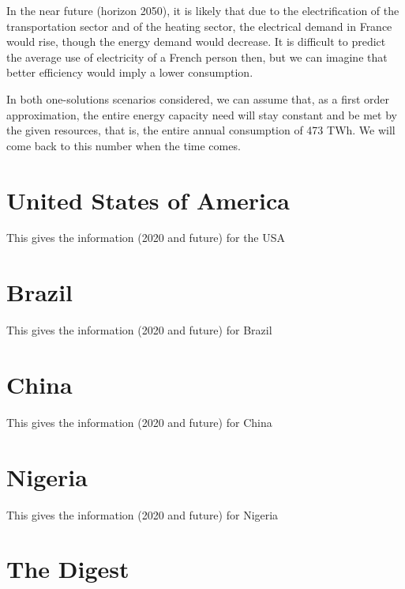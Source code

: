 In the near future (horizon 2050), it is likely that due to the electrification of the transportation sector and of the heating sector, the electrical demand in France would rise, though the energy demand would decrease. It is difficult to predict the average use of electricity of a French person then, but we can imagine that better efficiency would imply a lower consumption.


In both one-solutions scenarios considered, we can assume that, as a first order approximation, the entire energy capacity need will stay constant and be met by the given resources, that is, the entire annual consumption of 473 TWh. We will come back to this number when the time comes.




\section{United States of America}

This gives the information (2020 and future) for the USA

\section{Brazil}

This gives the information (2020 and future) for Brazil

\section{China}

This gives the information (2020 and future) for China

\section{Nigeria}

This gives the information (2020 and future) for Nigeria


\section{The Digest}


